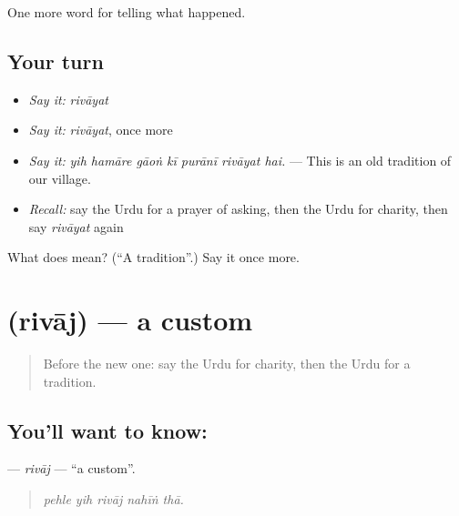 \begin{grammarlens}[title={What you've built}]
One more word for telling what happened.
\end{grammarlens}

\subsection*{Your turn}
\begin{itemize}
\raggedright
  \item \emph{Say it:} \emph{rivāyat}
  \item \emph{Say it:} \emph{rivāyat}, once more
  \item \emph{Say it:} \emph{yih hamāre gāoṅ kī purānī rivāyat hai.} — This is an old tradition of our village.
  \item \emph{Recall:} say the Urdu for a prayer of asking, then the Urdu for charity, then say \emph{rivāyat} again
\end{itemize}

\begin{tcolorbox}[breakable,colback=teal!4,colframe=teal!35!black,title={Before you move on}]
What does  mean? (\textquotedblleft{}A tradition\textquotedblright{}.) Say it once more.
\end{tcolorbox}
\section[\texorpdfstring{\ur{رواج} (rivāj)}{رواج (rivāj)}]{ (rivāj) — a custom}

\label{lesson:UR-C323-rivaj}



\begin{quote}
Before the new one: say the Urdu for charity, then the Urdu for a tradition.
\end{quote}

\subsection*{You'll want to know: }
\textbf{} — \emph{rivāj} — \textquotedblleft{}a custom\textquotedblright{}.

\begin{quote}
    
\end{quote}

\begin{quote}
\emph{pehle yih rivāj nahīṅ thā.}
\end{quote}

